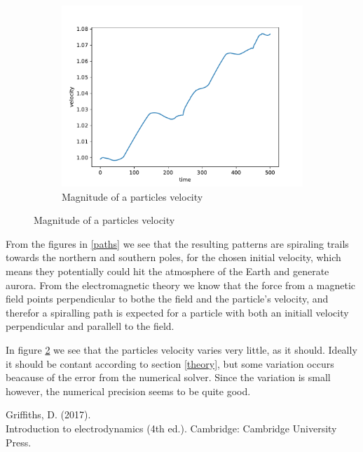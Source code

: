 \documentclass{article}
\begin{document}
\begin{figure}[h]
\begin{subfigure}{0.33\textwidth}
        \includegraphics[width=\linewidth]{./media/velocity.pdf}
        \caption{Magnitude of a particles velocity}
        \label{velocity}
    \end{subfigure}
\end{figure}

\begin{figure}

\end{figure}

\noindent
From the figures in \ref{paths} we see that the resulting patterns are spiraling trails towards the northern and southern poles, for the chosen initial velocity, which means they potentially could hit the atmosphere of the Earth and generate aurora. From the electromagnetic theory we know that the force from a magnetic field points perpendicular to bothe the field and the particle's velocity, and therefor a spiralling path is expected for a particle with both an initiall velocity
perpendicular and parallell to the field.

In figure \ref{velocity} we see that the particles velocity varies very little, as it should. Ideally it should be contant according to section \ref{theory}, but some variation occurs beacause of the error from the numerical solver. Since the variation is small however, the numerical precision seems to be quite good.


\begin{thebibliography}{99}
    Griffiths, D. (2017).\\
    Introduction to electrodynamics (4th ed.). Cambridge: Cambridge University Press.
\end{thebibliography}
\end{document}
